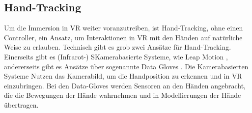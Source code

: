 \subsection{Hand-Tracking}
Um die Immersion in VR weiter voranzutreiben, ist Hand-Tracking, ohne einen Controller, ein Ansatz, um Interaktionen in VR mit den Händen auf natürliche Weise zu erlauben. 
Technisch gibt es grob zwei Ansätze für Hand-Tracking. Einerseits gibt es (Infrarot-) SKamerabasierte Systeme, wie Leap Motion \cite{Leap.2014}, andererseits gibt es Ansätze über sogenannte Data Gloves \cite{S.Lee.2017}. Die Kamerabasierten Systeme Nutzen das Kamerabild, um die Handposition zu erkennen und in VR einzubringen. Bei den Data-Gloves werden Sensoren an den Händen angebracht, die die Bewegungen der Hände wahrnehmen und in Modellierungen der Hände übertragen. 

